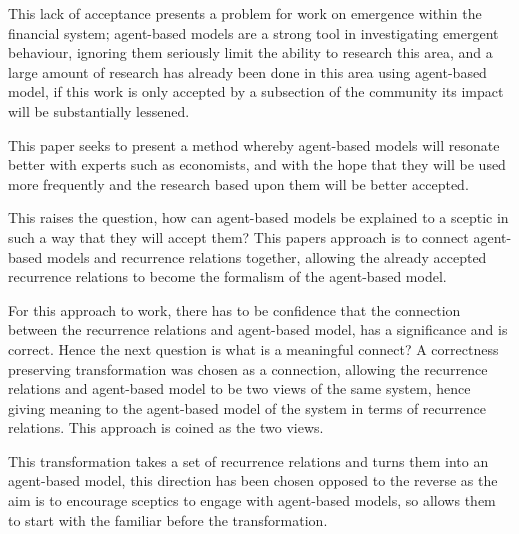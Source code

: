 \documentclass{article}
\begin{document}
This lack of acceptance presents a problem for work on emergence within the financial system; agent-based models are a strong tool in investigating emergent behaviour, ignoring them seriously limit the ability to research this area, and a large amount of research has already been done in this area using agent-based model, if this work is only accepted by a subsection of the community its impact will be substantially lessened.     

This paper seeks to present a method whereby agent-based models will resonate better with experts such as economists, and with the hope that they will be used more frequently and the research based upon them will be better accepted.   

This raises the question, how can agent-based models be explained to a sceptic in such a way that they will accept them? This papers approach is to connect agent-based models and recurrence relations together, allowing the already accepted recurrence relations to become the formalism of the agent-based model.

For this approach to work, there has to be confidence that the connection between the recurrence relations and agent-based model, has a significance and is correct. Hence the next question is what is a meaningful connect? A correctness preserving transformation was chosen as a connection, allowing the recurrence relations and agent-based model to be two views of the same system, hence giving meaning to the agent-based model of the system in terms of recurrence relations. This approach is coined as the two views.     

This transformation takes a set of recurrence relations and turns them into an agent-based model, this direction has been chosen opposed to the reverse as the aim is to encourage sceptics to engage with agent-based models, so allows them to start with the familiar before the transformation. 
\end{document}
